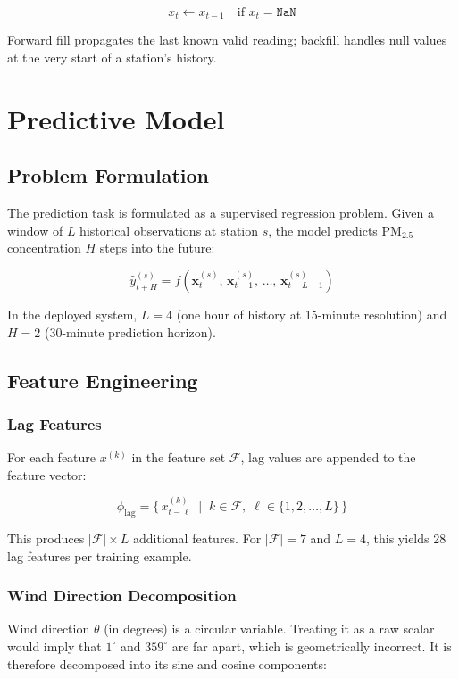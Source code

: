 \documentclass[12pt,a4paper]{article}
\begin{document}
\[
  x_{t} \leftarrow x_{t-1} \quad \text{if } x_t = \texttt{NaN}
\]

Forward fill propagates the last known valid reading; backfill handles null values at the very start of a station's history.

\section{Predictive Model}

\subsection{Problem Formulation}

The prediction task is formulated as a supervised regression problem. Given a window of $L$ historical observations at station $s$, the model predicts PM$_{2.5}$ concentration $H$ steps into the future:

\[
  \hat{y}_{t+H}^{(s)} = f\!\left(\mathbf{x}_{t}^{(s)},\, \mathbf{x}_{t-1}^{(s)},\, \ldots,\, \mathbf{x}_{t-L+1}^{(s)}\right)
\]

In the deployed system, $L = 4$ (one hour of history at 15-minute resolution) and $H = 2$ (30-minute prediction horizon).

\subsection{Feature Engineering}

\subsubsection{Lag Features}

For each feature $x^{(k)}$ in the feature set $\mathcal{F}$, lag values are appended to the feature vector:

\[
  \phi_{\text{lag}} = \bigl\{\, x^{(k)}_{t-\ell} \;\mid\; k \in \mathcal{F},\; \ell \in \{1, 2, \ldots, L\} \,\bigr\}
\]

This produces $|\mathcal{F}| \times L$ additional features. For $|\mathcal{F}| = 7$ and $L = 4$, this yields 28 lag features per training example.

\subsubsection{Wind Direction Decomposition}

Wind direction $\theta$ (in degrees) is a circular variable. Treating it as a raw scalar would imply that $1^\circ$ and $359^\circ$ are far apart, which is geometrically incorrect. It is therefore decomposed into its sine and cosine components:
\end{document}
